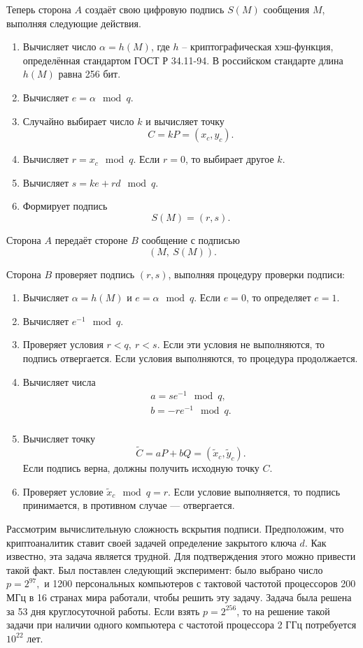 Теперь сторона $A$ создаёт свою цифровую подпись $S(M)$ сообщения $M$, выполняя следующие действия.
\begin{enumerate}
    \item Вычисляет число $\alpha = h(M)$, где $h$ -- криптографическая хэш-функция, определённая стандартом ГОСТ Р 34.11-94. В российском стандарте длина $h(M)$ равна 256 бит.
    \item Вычисляет  $e = \alpha \mod q$.
    \item Случайно выбирает число $k$ и вычисляет точку
        \[ C = k P = (x_c, y_c). \]
    \item Вычисляет  $r = x_c \mod q$.
	Если $r = 0$, то выбирает другое $k$.
    \item Вычисляет  $s = k e + r d \mod q$.
    \item Формирует подпись
        \[ S(M) = (r, s). \]
\end{enumerate}
Сторона $A$ передаёт стороне $B$ сообщение с подписью
    \[ (M, ~ S(M)). \]

Сторона $B$ проверяет подпись $(r,s)$, выполняя процедуру проверки подписи:
\begin{enumerate}
    \item Вычисляет  $\alpha = h(M)$ и $e = \alpha \mod q$. Если $e = 0$, то определяет $e = 1$.
    \item Вычисляет  $e^{-1} \mod q$.
    \item Проверяет условия $r < q, ~ r < s$. Если эти условия не выполняются, то подпись отвергается. Если условия выполняются, то процедура продолжается.
    \item Вычисляет числа
        \[ \begin{array}{l}
            a = s e^{-1} \mod q, \\
            b = -r e^{-1} \mod q. \\
        \end{array} \]
    \item Вычисляет точку
        \[ \tilde{C} = a P + b Q = (\tilde{x}_c, \tilde{y}_c). \]
        Если подпись верна, должны получить исходную точку $C$.
    \item Проверяет условие $\tilde{x}_{c} \mod q = r$. Если условие выполняется, то подпись принимается, в противном случае --- отвергается.
\end{enumerate}

Рассмотрим вычислительную сложность вскрытия подписи. Предположим, что криптоаналитик ставит своей задачей определение закрытого ключа $d$. Как известно, эта задача является трудной. Для подтверждения этого можно привести такой факт. Был поставлен следующий эксперимент: было выбрано число $p = 2^{97},$ и 1200 персональных компьютеров с тактовой частотой процессоров 200 МГц в 16 странах мира работали, чтобы решить эту задачу. Задача была решена за 53 дня круглосуточной работы. Если взять $p = 2^{256}$, то на решение такой задачи при наличии одного компьютера с частотой процессора 2 ГГц потребуется $10^{22}$ лет.

